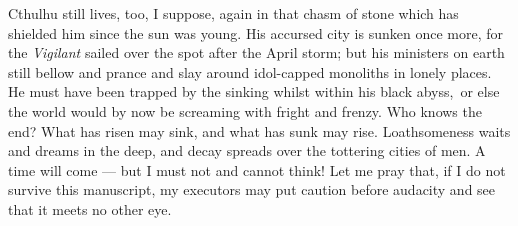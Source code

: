 Cthulhu still lives, too, I suppose, again in that chasm of stone which
has shielded him since the sun was young. His accursed city is sunken
once more, for the \emph{Vigilant} sailed over the spot after the April storm;
but his ministers on earth still bellow and prance and slay around
idol-capped monoliths in lonely places. He must have been trapped by the
sinking whilst within his black abyss,\est\ or else the world would by now be
screaming with fright and frenzy. Who knows the end? What has risen may
sink, and what has sunk may rise. Loathsomeness waits and dreams in the
deep, and decay spreads over the tottering cities of men. A time will
come --- but I must not and cannot think! Let me pray that, if I do not
survive this manuscript, my executors may put caution before audacity
and see that it meets no other eye.



